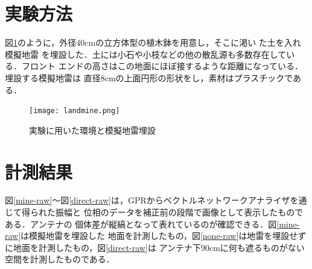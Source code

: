 ﻿\documentclass[12pt,oneside]{jsbook}
\begin{document}
\section{実験方法}
図\ref{landmine}のように，外径40cmの立方体型の植木鉢を用意し，そこに渇い
た土を入れ模擬地雷
を埋設した．土には小石や小枝などの他の散乱源も多数存在している．フロント
エンドの高さはこの地面にほぼ接するような距離になっている．埋設する模擬地雷は
直径8cmの上面円形の形状をし，素材はプラスチックである．
\begin{figure}[hbtp]
 \begin{center}
 \texttt{[image: landmine.png]}
\caption{実験に用いた環境と模擬地雷埋設}
\label{landmine}
 \end{center}
\end{figure}
\section{計測結果}
図\ref{mine-raw}〜図\ref{direct-raw}は，GPRからベクトルネットワークアナライザを通じて得られた振幅と
位相のデータを補正前の段階で画像として表示したものである．アンテナの
個体差が縦縞となって表れているのが確認できる．図\ref{mine-raw}は模擬地雷を埋設した
地面を計測したもの，図\ref{none-raw}は地雷を埋設せずに地面を計測したもの，図\ref{direct-raw}は
アンテナ下90cmに何も遮るものがない空間を計測したものである．
\end{document}
